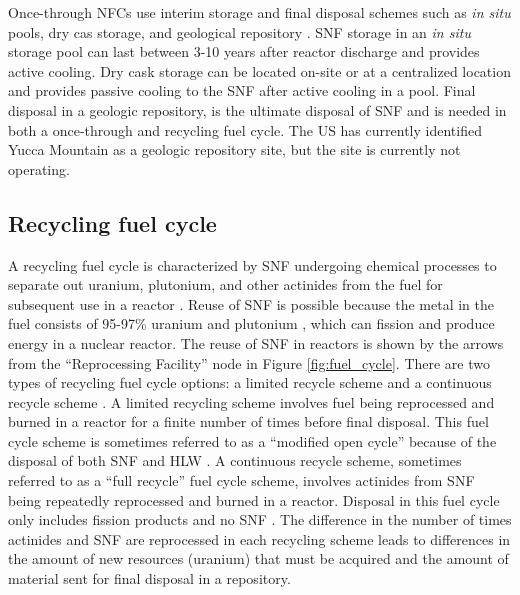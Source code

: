 Once-through \glspl{NFC} use interim storage and final disposal schemes
such as \textit{in situ} pools, dry cas storage, and geological 
repository \cite{rodriguez-penalonga_review_2017}. \gls{SNF} storage in 
an \textit{in situ} storage pool can last between 3-10 years after 
reactor discharge \cite{rodriguez-penalonga_review_2017}
and provides active cooling. Dry cask storage can be located 
on-site or at a centralized location and provides passive 
cooling to the \gls{SNF} after active cooling in a pool. 
Final disposal in a geologic repository, is the ultimate disposal 
of \gls{SNF} and 
is needed in both a once-through and recycling fuel cycle. The 
US has currently identified Yucca Mountain as a geologic repository 
site, but the site is currently not operating.  

\subsection{Recycling fuel cycle}
A recycling fuel cycle is characterized by \gls{SNF} undergoing chemical 
processes to separate out uranium, plutonium, and other 
actinides from the fuel for subsequent use in a reactor
 \cite{rodriguez-penalonga_review_2017}. 
Reuse of \gls{SNF} is possible because the metal in the fuel 
consists of 95-97\% uranium and 
plutonium \cite{rodriguez-penalonga_review_2017}, which can fission and 
produce energy in a nuclear reactor. The reuse of \gls{SNF} in 
reactors is shown by the arrows from the ``Reprocessing Facility''
node in Figure \ref{fig:fuel_cycle}. 
There are two types of recycling fuel cycle options: a limited 
recycle scheme and a continuous recycle scheme \cite{wigeland_nuclear_2014}. 
A limited recycling scheme involves fuel being reprocessed and burned in 
a reactor for a finite number of times before final disposal. This
fuel cycle scheme is sometimes referred to as a ``modified open cycle''
because of the disposal of both \gls{SNF} and \gls{HLW}
\cite{wigeland_identification_2011}. A continuous 
recycle scheme, sometimes referred to as a ``full recycle'' fuel 
cycle scheme, involves actinides from \gls{SNF} being repeatedly reprocessed 
and burned in a reactor. Disposal in this fuel cycle only includes 
fission products 
and no \gls{SNF} \cite{wigeland_identification_2011}. The difference 
in the number of times actinides and \gls{SNF} are reprocessed in each 
recycling scheme leads to differences in the amount of new resources 
(uranium) that must be acquired and the amount of material 
sent for final disposal in a repository. 


